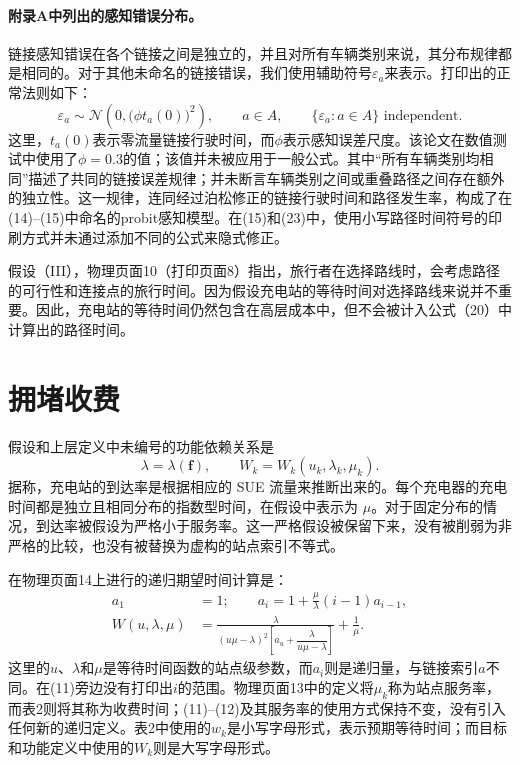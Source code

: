\documentclass{article}
\begin{document}
\paragraph{附录A中列出的感知错误分布。}
链接感知错误在各个链接之间是独立的，并且对所有车辆类别来说，其分布规律都是相同的。对于其他未命名的链接错误，我们使用辅助符号$\varepsilon_a$来表示。打印出的正常法则如下：
\[
\varepsilon_a\sim\mathcal N\!\left(0,\bigl(\phi t_a(0)\bigr)^2\right),
\qquad a\in A,
\qquad \{\varepsilon_a:a\in A\}\text{ independent}.
\]
这里，$t_a(0)$表示零流量链接行驶时间，而$\phi$表示感知误差尺度。该论文在数值测试中使用了$\phi=0.3$的值；该值并未被应用于一般公式。其中“所有车辆类别均相同”描述了共同的链接误差规律；并未断言车辆类别之间或重叠路径之间存在额外的独立性。这一规律，连同经过泊松修正的链接行驶时间和路径发生率，构成了在(14)--(15)中命名的probit感知模型。在(15)和(23)中，使用小写路径时间符号的印刷方式并未通过添加不同的公式来隐式修正。

假设（III），物理页面10（打印页面8）指出，旅行者在选择路线时，会考虑路径的可行性和连接点的旅行时间。因为假设充电站的等待时间对选择路线来说并不重要。因此，充电站的等待时间仍然包含在高层成本中，但不会被计入公式（20）中计算出的路径时间。

\section*{拥堵收费}
假设和上层定义中未编号的功能依赖关系是
\[
\lambda=\lambda(\mathbf f),\qquad
W_k=W_k(u_k,\lambda_k,\mu_k).
\]
据称，充电站的到达率是根据相应的 SUE 流量来推断出来的。每个充电器的充电时间都是独立且相同分布的指数型时间，在假设中表示为 $\mu$。对于固定分布的情况，到达率被假设为严格小于服务率。这一严格假设被保留下来，没有被削弱为非严格的比较，也没有被替换为虚构的站点索引不等式。

在物理页面14上进行的递归期望时间计算是：
\begin{align}
a_1&=1;\qquad a_i=1+\frac{\mu}{\lambda}(i-1)a_{i-1},\tag{11}\\
W(u,\lambda,\mu)&=
\frac{\lambda}{(u\mu-\lambda)^2
\left[a_u+\dfrac{\lambda}{u\mu-\lambda}\right]}+\frac{1}{\mu}.\tag{12}
\end{align}
这里的$u$、$\lambda$和$\mu$是等待时间函数的站点级参数，而$a_i$则是递归量，与链接索引$a$不同。在(11)旁边没有打印出$i$的范围。物理页面13中的定义将$\mu_k$称为站点服务率，而表2则将其称为收费时间；(11)--(12)及其服务率的使用方式保持不变，没有引入任何新的递归定义。表2中使用的$w_k$是小写字母形式，表示预期等待时间；而目标和功能定义中使用的$W_k$则是大写字母形式。
\end{document}
